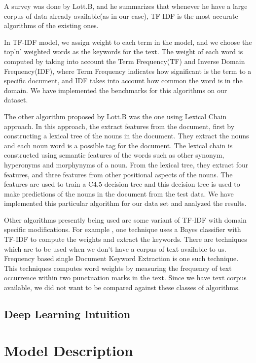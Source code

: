 \documentclass[dvips,12pt]{article}
\begin{document}
		A survey was done by Lott.B\cite{lott2012survey}, and he summarizes that whenever he have a large corpus of data already available(as in our case), TF-IDF is the most accurate algorithms of the existing ones. 
		
		In TF-IDF model, we assign weight to each term in the model, and we choose the top'n' weighted words as the keywords for the text. The weight of each word is computed by taking into account the Term Frequency(TF) and Inverse Domain Frequency(IDF), where Term Frequency indicates how significant is the term to a specific document, and IDF takes into account how common the word is in the domain. We have implemented the benchmarks for this algorithms on our dataset.
		
		The other algorithm proposed by Lott.B was the one using Lexical Chain approach. In this approach, the extract features from the document, first by constructing a lexical tree of the nouns in the document. They extract the nouns and each noun word is a possible tag for the document. The lexical chain is constructed using semantic features of the words such as other synonym, hyperonyms and morphynyms of a noun. From the lexical tree, they extract four features, and three features from other positional aspects of the nouns. The features are used to train a C4.5 decision tree and this decision tree is used to make predictions of the nouns in the document from the test data. We have implemented this particular algorithm for our data set and analyzed the results.
		
		Other algorithms presently being used are some variant of TF-IDF with domain specific modifications. For example , one technique uses a Bayes classifier with TF-IDF to compute the weights and extract the keywords. 
		There are techniques which are to be used when we don't have a corpus of text available to us. Frequency based single Document Keyword Extraction is one such technique. This techniques computes word weights by measuring the frequency of text occurrence within two punctuation marks in the text. Since we have text corpus available, we did not want to be compared against these classes of algorithms.
		\subsection{Deep Learning Intuition}
	\section{Model Description}
\end{document}
